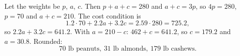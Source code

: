 Let the weights be $p$, $a$, $c$. Then $p+a+c=280$ and $a+c=3p$, so $4p=280$, $p=70$ and $a+c=210$. The cost condition is
\[1.2\cdot70+2.2a+3.2c=2.59\cdot280=725.2,\]
so $2.2a+3.2c=641.2$. With $a=210-c$: $462+c=641.2$, so $c=179.2$ and $a=30.8$. Rounded:
\[\boxed{70\text{ lb peanuts},\ 31\text{ lb almonds},\ 179\text{ lb cashews}}.\]
